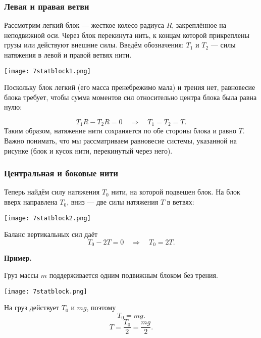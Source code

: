 \documentclass[12pt, a4paper]{article}%
\begin{document}
\subsubsection*{Левая и правая ветви}
Рассмотрим легкий блок — жесткое колесо радиуса \(R\), закреплённое на неподвижной оси. 
Через блок перекинута нить, к концам которой прикреплены грузы или действуют внешние силы. 
Введём обозначения: \(T_1\) и \(T_2\) — силы натяжения в левой и правой ветвях нити. 

\begin{center}
\texttt{[image: 7statblock1.png]}
\label{fig:mpr}
\end{center}

Поскольку блок легкий (его масса пренебрежимо мала) и трения нет, равновесие блока требует, чтобы сумма моментов сил относительно центра блока была равна нулю:

\[
T_1R - T_2R = 0
\quad\Longrightarrow\quad
T_1 = T_2 = T.
\]
Таким образом, натяжение нити сохраняется по обе стороны блока и равно \(T\).
Важно понимать, что мы рассматриваем равновесие системы, указанной на рисунке (блок и кусок нити, перекинутый через него). 


\subsubsection*{Центральная и боковые нити}

Теперь найдём силу натяжения $T_0$ нити, на которой подвешен блок. На блок вверх направлена $T_0$, вниз — две силы натяжения \(T\) в ветвях:

\begin{center}
\texttt{[image: 7statblock2.png]}
\label{fig:mpr}
\end{center}


Баланс вертикальных сил даёт
\[
T_0 - 2T = 0
\quad\Longrightarrow\quad
T_0 = 2T.
\]


\textbf{Пример.} 

Груз массы \(m\) поддерживается одним подвижным блоком без трения.

\begin{center}
\texttt{[image: 7statblock.png]}
\label{fig:mpr}
\end{center}



На груз действует $T_0$ и $mg$, поэтому
\[
T_0 = mg.
\]
\[
T = \frac{T_0}{2} = \frac{mg}{2}.
\]
\end{document}

